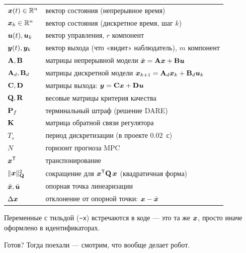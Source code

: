 \begin{center}
\begin{tabular}{ll}
\toprule
$\bm{x}(t) \in \mathbb{R}^n$    & вектор состояния (непрерывное время)\\
$\bm{x}_k \in \mathbb{R}^n$     & вектор состояния (дискретное время, шаг $k$)\\
$\bm{u}(t), \bm{u}_k$    & вектор управления, $r$ компонент\\
$\bm{y}(t), \bm{y}_k$    & вектор выхода (что «видит» наблюдатель), $m$ компонент\\
$\mathbf{A}, \mathbf{B}$           & матрицы непрерывной модели $\dot{\bm{x}} = \mathbf{A}\bm{x} + \mathbf{B}\bm{u}$\\
$\mathbf{A}_d, \mathbf{B}_d$       & матрицы дискретной модели $\bm{x}_{k+1} = \mathbf{A}_d\bm{x}_k + \mathbf{B}_d\bm{u}_k$\\
$\mathbf{C}, \mathbf{D}$           & матрицы выхода: $\bm{y} = \mathbf{C}\bm{x} + \mathbf{D}\bm{u}$\\
$\mathbf{Q}, \mathbf{R}$           & весовые матрицы критерия качества\\
$\mathbf{P}_f$                  & терминальный штраф (решение DARE)\\
$\mathbf{K}$                    & матрица обратной связи регулятора\\
$T_s$                        & период дискретизации (в проекте $0.02$~с)\\
$N$                          & горизонт прогноза MPC\\
$\bm{x}^{\mathsf{T}}$                 & транспонирование\\
$\|\bm{x}\|_{\mathbf{Q}}^2$   & сокращение для $\bm{x}^{\mathsf{T}} \mathbf{Q}\, \bm{x}$ (квадратичная форма)\\
$\bar{\bm{x}}, \bar{\bm{u}}$ & опорная точка линеаризации\\
$\Delta\bm{x}$             & отклонение от опорной точки: $\bm{x} - \bar{\bm{x}}$\\
\bottomrule
\end{tabular}
\end{center}

Переменные с тильдой (\texttt{\~{}x}) встречаются в коде --- это та же
$\bm{x}$, просто иначе оформлено в идентификаторах.

\medskip
Готов? Тогда поехали ---  смотрим, что вообще делает робот.
